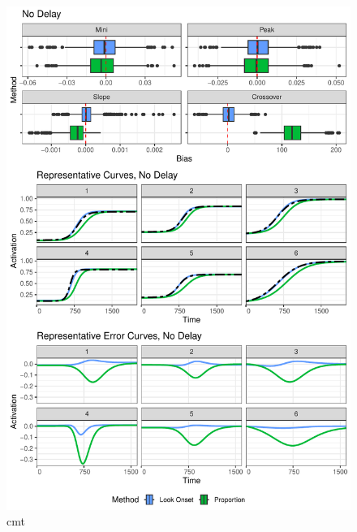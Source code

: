 \documentclass{article}
\begin{document}
\begin{figure}[H]
\centering
\includegraphics{rep_and_diff_no_delay.pdf}
\caption{cmt}
\label{fig:panel_no_delay}
\end{figure}
\end{document}
